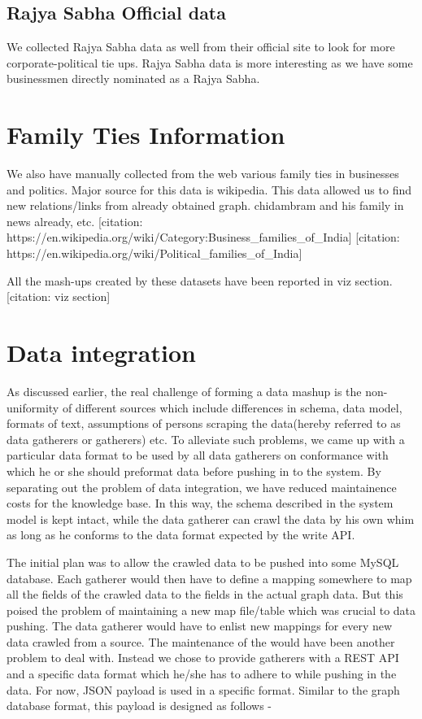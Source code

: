 \subsection{Rajya Sabha Official data}

We collected Rajya Sabha data as well from their official site to look for more corporate-political tie ups. Rajya Sabha data is more interesting as we have some businessmen directly nominated as a Rajya Sabha.  

\section{Family Ties Information}

We also have manually collected from the web various family ties in businesses and politics. Major source for this data is wikipedia. This data allowed us to find new relations/links from already obtained graph.
chidambram and his family in news already, etc.
[citation: https://en.wikipedia.org/wiki/Category:Business\_families\_of\_India]
[citation: https://en.wikipedia.org/wiki/Political\_families\_of\_India]

All the mash-ups created by these datasets have been reported in viz section. [citation: viz section]

\section{Data integration}

As discussed earlier, the real challenge of forming a data mashup is the non-uniformity of different sources which include differences in schema, data model, formats of text, assumptions of persons scraping the data(hereby referred to as data gatherers or gatherers) etc. To alleviate such problems, we came up with a particular data format to be used by all data gatherers on conformance with which he or she should preformat data before pushing in to the system. By separating out the problem of data integration, we have reduced maintainence costs for the knowledge base. In this way, the schema described in the system model is kept intact, while the data gatherer can crawl the data by his own whim as long as he conforms to the data format expected by the write API.

The initial plan was to allow the crawled data to be pushed into some MySQL database. Each gatherer would then have to define a mapping somewhere to map all the fields of the crawled data to the fields in the actual graph data. But this poised the problem of maintaining a new map file/table which was crucial to data pushing. The data gatherer would have to enlist new mappings for every new data crawled from a source. The maintenance of the  would have been another problem to deal with.
%
Instead we chose to provide gatherers with a REST API and  a specific data format which he/she has to adhere to while pushing in the data.
For now, JSON payload is used in a specific format. Similar to the graph database format, this payload is designed as follows -

